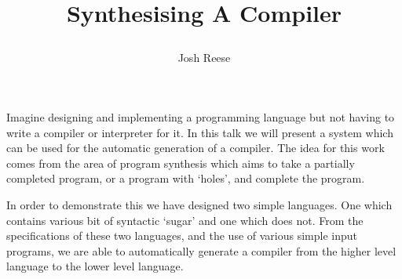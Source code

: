 \documentclass[11pt]{article}
\date{}
\title{Synthesising A Compiler\author{Josh Reese}}
\begin{document}
\maketitle
Imagine designing and implementing a programming language but not
having to write a compiler or interpreter for it. In this talk we will
present a system which can be used for the automatic generation of a
compiler. The idea for this work comes from the area of program
synthesis which aims to take a partially completed program, or a
program with `holes', and complete the program.

In order to demonstrate this we have designed two simple
languages. One which contains various bit of syntactic `sugar' and one
which does not. From the specifications of these two languages, and
the use of various simple input programs, we are able to automatically
generate a compiler from the higher level language to the lower level
language.  
\end{document}
